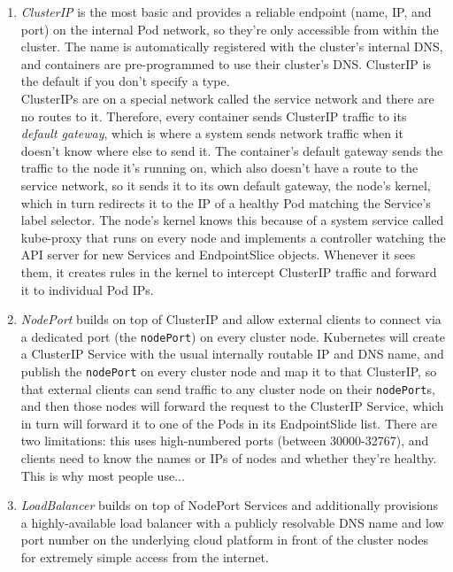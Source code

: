 \documentclass[table, xcdraw]{article}%
\begin{document}
\begin{enumerate}
    \item \emph{ClusterIP} is the most basic and provides a reliable endpoint (name, IP, and port) on the internal Pod network, so they're only accessible from within the cluster. The name is automatically registered with the cluster’s internal DNS, and containers are pre-programmed to use their cluster's DNS. ClusterIP is the default if you don't specify a type.\\
    ClusterIPs are on a special network called the service network and there are no routes to it. Therefore, every container sends ClusterIP traffic to its \emph{default gateway}, which is where a system sends network traffic when it doesn’t know where else to send it. The container’s default gateway sends the traffic to the node it’s running on, which also doesn’t have a route to the service network, so it sends it to its own default gateway, the node's kernel, which in turn redirects it to the IP of a healthy Pod matching the Service’s label selector. The node's kernel knows this because of a system service called kube-proxy that runs on every node and implements a controller watching the API server for new Services and EndpointSlice objects. Whenever it sees them, it creates rules in the kernel to intercept ClusterIP traffic and forward it to individual Pod IPs.
    \item \emph{NodePort} builds on top of ClusterIP and allow external clients to connect via a dedicated port (the \texttt{nodePort}) on every cluster node. Kubernetes will create a ClusterIP Service with the usual internally routable IP and DNS name, and publish the \texttt{nodePort} on every cluster node and map it to that ClusterIP, so that external clients can send traffic to any cluster node on their \texttt{nodePort}s, and then those nodes will forward the request to the ClusterIP Service, which in turn will forward it to one of the Pods in its EndpointSlide list. There are two limitations: this uses high-numbered ports (between 30000-32767), and clients need to know the names or IPs of nodes and whether they're healthy. This is why most people use...
    \item \emph{LoadBalancer} builds on top of NodePort Services and additionally provisions a highly-available load balancer with a publicly resolvable DNS name and low port number on the underlying cloud platform in front of the cluster nodes for extremely simple access from the internet.
\end{enumerate}
\end{document}
